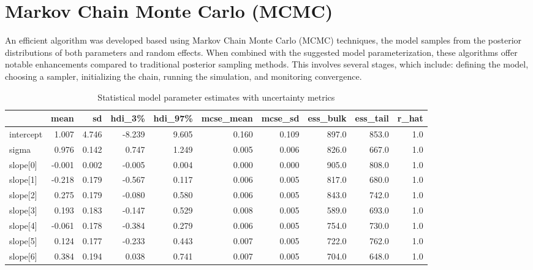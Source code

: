 \section{Markov Chain Monte Carlo (MCMC)}
An efficient algorithm was developed based using Markov Chain Monte Carlo (MCMC) techniques, the model samples from the posterior distributions of both parameters and random effects. When combined with the suggested model parameterization, these algorithms offer notable enhancements compared to traditional posterior sampling methods. This involves several stages, which include: defining the model, choosing a sampler, initializing the chain, running the simulation, and monitoring convergence.

\begin{table}[htbp]
\centering
\begin{tabular}{lrrrrrrrrr}
\hline
 & mean & sd & hdi\_3\% & hdi\_97\% & mcse\_mean & mcse\_sd & ess\_bulk & ess\_tail & r\_hat \\
\hline
intercept & 1.007 & 4.746 & -8.239 & 9.605 & 0.160 & 0.109 & 897.0 & 853.0 & 1.0 \\
sigma & 0.976 & 0.142 & 0.747 & 1.249 & 0.005 & 0.006 & 826.0 & 667.0 & 1.0 \\
slope[0] & -0.001 & 0.002 & -0.005 & 0.004 & 0.000 & 0.000 & 905.0 & 808.0 & 1.0 \\
slope[1] & -0.218 & 0.179 & -0.567 & 0.117 & 0.006 & 0.005 & 817.0 & 680.0 & 1.0 \\
slope[2] & 0.275 & 0.179 & -0.080 & 0.580 & 0.006 & 0.005 & 843.0 & 742.0 & 1.0 \\
slope[3] & 0.193 & 0.183 & -0.147 & 0.529 & 0.008 & 0.005 & 589.0 & 693.0 & 1.0 \\
slope[4] & -0.061 & 0.178 & -0.384 & 0.279 & 0.006 & 0.005 & 754.0 & 730.0 & 1.0 \\
slope[5] & 0.124 & 0.177 & -0.233 & 0.443 & 0.007 & 0.005 & 722.0 & 762.0 & 1.0 \\
slope[6] & 0.384 & 0.194 & 0.038 & 0.741 & 0.007 & 0.005 & 704.0 & 648.0 & 1.0 \\
\hline
\end{tabular}
\caption{Statistical model parameter estimates with uncertainty metrics}
\label{tab:model_estimates}
\end{table}

